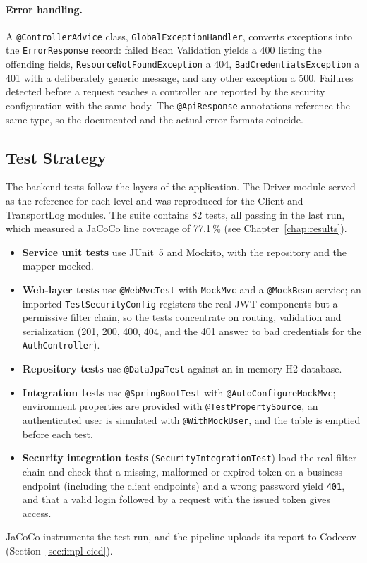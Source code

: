 \paragraph{Error handling.} A \texttt{@ControllerAdvice} class, \texttt{GlobalExceptionHandler}, converts exceptions into the \texttt{ErrorResponse} record: failed Bean Validation yields a 400 listing the offending fields, \texttt{ResourceNotFoundException} a 404, \texttt{BadCredentialsException} a 401 with a deliberately generic message, and any other exception a 500. Failures detected before a request reaches a controller are reported by the security configuration with the same body. The \texttt{@ApiResponse} annotations reference the same type, so the documented and the actual error formats coincide.

\subsection{Test Strategy}

The backend tests follow the layers of the application. The Driver module served as the reference for each level and was reproduced for the Client and TransportLog modules. The suite contains 82 tests, all passing in the last run, which measured a JaCoCo line coverage of 77.1\,\% (see Chapter~\ref{chap:results}).
\begin{itemize}
  \item \textbf{Service unit tests} use JUnit~5 and Mockito, with the repository and the mapper mocked.
  \item \textbf{Web-layer tests} use \texttt{@WebMvcTest} with \texttt{MockMvc} and a \texttt{@MockBean} service; an imported \texttt{TestSecurityConfig} registers the real JWT components but a permissive filter chain, so the tests concentrate on routing, validation and serialization (201, 200, 400, 404, and the 401 answer to bad credentials for the \texttt{AuthController}).
  \item \textbf{Repository tests} use \texttt{@DataJpaTest} against an in-memory H2 database.
  \item \textbf{Integration tests} use \texttt{@SpringBootTest} with \texttt{@AutoConfigureMockMvc}; environment properties are provided with \texttt{@TestPropertySource}, an authenticated user is simulated with \texttt{@WithMockUser}, and the table is emptied before each test.
  \item \textbf{Security integration tests} (\texttt{SecurityIntegrationTest}) load the real filter chain and check that a missing, malformed or expired token on a business endpoint (including the client endpoints) and a wrong password yield \texttt{401}, and that a valid login followed by a request with the issued token gives access.
\end{itemize}
JaCoCo instruments the test run, and the pipeline uploads its report to Codecov (Section~\ref{sec:impl-cicd}).

